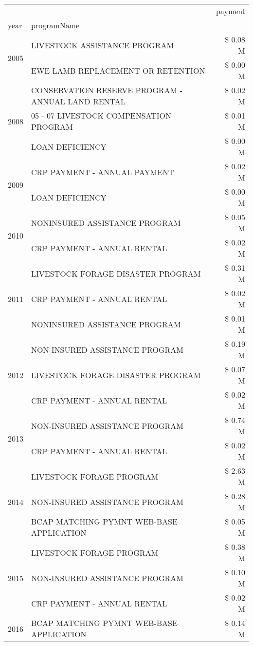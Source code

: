 \begin{tabular}{llr}
\toprule
 &  & payment \\
year & programName &  \\
\midrule
\multirow[t]{2}{*}{2005} & LIVESTOCK ASSISTANCE PROGRAM & \$ 0.08 M \\
 & EWE LAMB REPLACEMENT OR RETENTION & \$ 0.00 M \\
\cline{1-3}
\multirow[t]{3}{*}{2008} & CONSERVATION RESERVE PROGRAM - ANNUAL LAND RENTAL & \$ 0.02 M \\
 & 05 - 07 LIVESTOCK COMPENSATION PROGRAM & \$ 0.01 M \\
 & LOAN DEFICIENCY & \$ 0.00 M \\
\cline{1-3}
\multirow[t]{2}{*}{2009} & CRP PAYMENT - ANNUAL PAYMENT & \$ 0.02 M \\
 & LOAN DEFICIENCY & \$ 0.00 M \\
\cline{1-3}
\multirow[t]{2}{*}{2010} & NONINSURED ASSISTANCE PROGRAM & \$ 0.05 M \\
 & CRP PAYMENT - ANNUAL RENTAL & \$ 0.02 M \\
\cline{1-3}
\multirow[t]{3}{*}{2011} & LIVESTOCK FORAGE DISASTER PROGRAM & \$ 0.31 M \\
 & CRP PAYMENT - ANNUAL RENTAL & \$ 0.02 M \\
 & NONINSURED ASSISTANCE PROGRAM & \$ 0.01 M \\
\cline{1-3}
\multirow[t]{3}{*}{2012} & NON-INSURED ASSISTANCE PROGRAM & \$ 0.19 M \\
 & LIVESTOCK FORAGE DISASTER PROGRAM & \$ 0.07 M \\
 & CRP PAYMENT - ANNUAL RENTAL & \$ 0.02 M \\
\cline{1-3}
\multirow[t]{2}{*}{2013} & NON-INSURED ASSISTANCE PROGRAM & \$ 0.74 M \\
 & CRP PAYMENT - ANNUAL RENTAL & \$ 0.02 M \\
\cline{1-3}
\multirow[t]{3}{*}{2014} & LIVESTOCK FORAGE PROGRAM & \$ 2.63 M \\
 & NON-INSURED ASSISTANCE PROGRAM & \$ 0.28 M \\
 & BCAP MATCHING PYMNT WEB-BASE APPLICATION & \$ 0.05 M \\
\cline{1-3}
\multirow[t]{3}{*}{2015} & LIVESTOCK FORAGE PROGRAM & \$ 0.38 M \\
 & NON-INSURED ASSISTANCE PROGRAM & \$ 0.10 M \\
 & CRP PAYMENT - ANNUAL RENTAL & \$ 0.02 M \\
\cline{1-3}
\multirow[t]{3}{*}{2016} & BCAP MATCHING PYMNT WEB-BASE APPLICATION & \$ 0.14 M \\

\end{tabular}
